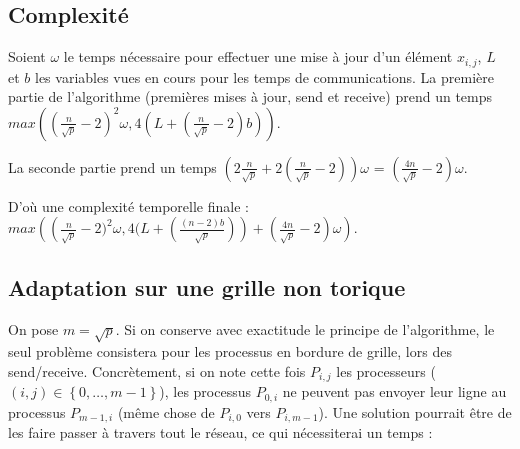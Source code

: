 \documentclass{article}
\begin{document}
\subsection*{Complexité}

Soient $\omega$ le temps nécessaire pour effectuer une mise à jour d'un élément $x_{i,j}$, $L$ et $b$ les variables vues en cours pour les temps de communications. %
La première partie de l'algorithme (premières mises à jour, send et receive) prend un temps $ max \left((\frac{n}{\sqrt{p}}-2)^2\omega, 4(L + (\frac{n}{\sqrt{p}}-2)b) \right) $.

La seconde partie prend un temps $(2\frac{n}{\sqrt{p}} + 2(\frac{n}{\sqrt{p}}-2))\omega$ = $(\frac{4n}{\sqrt{p}}-2)\omega$.

D'où une complexité temporelle finale : $max \left( \left(\frac{n}{\sqrt{p}}-2)^2\omega, 4(L + (\frac{(n-2)b}{\sqrt{p}}) \right) + \left(\frac{4n}{\sqrt{p}}-2 \right)\omega \right)$.

\subsection*{Adaptation sur une grille non torique}

On pose $m = \sqrt{p}$.
Si on conserve avec exactitude le principe de l'algorithme, le seul problème consistera pour les processus en bordure de grille, lors des send/receive.
Concrètement, si on note cette fois $P_{i,j}$ les processeurs ($(i,j) \in \left\{ 0, \dots,m-1\right\}$), les processus $P_{0,i}$ ne peuvent pas envoyer leur ligne au processus $P_{m-1,i}$ (même chose de $P_{i,0}$ vers $P_{i,m-1}$).
Une solution pourrait être de les faire passer à travers tout le réseau, ce qui nécessiterai un temps : %
\end{document}

